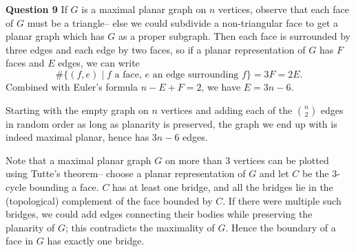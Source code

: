 \documentclass[12pt]{article}
\begin{document}
\textbf{Question 9}\quad 
If \(G\) is a maximal planar graph on \(n\) vertices, observe that each face of
\(G\) must be a triangle-- else we could subdivide a non-triangular face to get
a planar graph which has \(G\) as a proper subgraph. Then each face is
surrounded by three edges and each edge by two faces, so if a planar
representation of \(G\) has \(F\) faces and \(E\) edges, we can write  
\[\#\{(f,e)\;|\;f\text{ a face, } e\text{ an edge surrounding }f\} = 3F = 2E.\]
Combined with Euler's formula \(n-E+F=2\), we have \(E= 3n-6\). 

Starting with the empty graph on \(n\) vertices and adding each of the
\(\binom{n}{2}\) edges in random order as long as planarity is preserved, the
graph we end up with is indeed maximal planar, hence has \(3n-6\) edges. 

Note that a maximal planar graph \(G\) on more than \(3\) vertices can be plotted using Tutte's theorem-- choose a planar representation of \(G\) and let \(C\) be the \(3\)-cycle
bounding a face. \(C\) has at least one bridge, and all the bridges lie in the
(topological) complement of the face bounded by \(C\). If there were multiple
such bridges, we could add edges connecting their bodies while preserving the
planarity of \(G\); this contradicts the maximality of \(G\). Hence the boundary
of a face in \(G\) has exactly one bridge.
\end{document}
